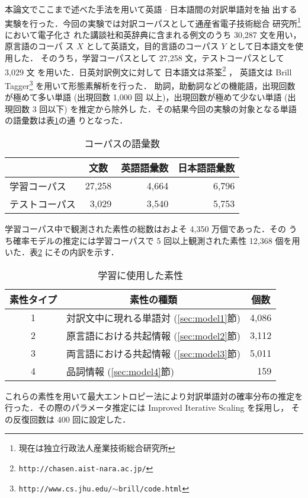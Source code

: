 本論文でここまで述べた手法を用いて英語 $\cdot$ 日本語間の対訳単語対を抽
出する実験を行った．今回の実験では対訳コーパスとして通産省電子技術総合
研究所\footnote{現在は独立行政法人産業技術総合研究所}において電子化さ
れた講談社和英辞典に含まれる例文のうち 30,287 文を用い，原言語のコーパ
ス $X$ として英語文，目的言語のコーパス $Y$ として日本語文を使用した．
そのうち，学習コーパスとして 27,258 文，テストコーパスとして 3,029 文
を用いた．日英対訳例文に対して
日本語文は茶筌\footnote{{\tt http://chasen.aist-nara.ac.jp/}}
\cite{chasen20}，
英語文は Brill
Tagger\footnote{{\tt http://www.cs.jhu.edu/$\sim$brill/code.html}}
\cite{brill_94}
を用いて形態素解析を行った．
助詞，助動詞などの機能語，出現回数が極めて多い単語 (出現回数 1,000 回
以上)，出現回数が極めて少ない単語 (出現回数 3 回以下) を推定から除外し
た．その結果今回の実験の対象となる単語の語彙数は表\ref{tab:corpus}の通
りとなった．
\begin{table}[htbp]
  \centering
  \caption{コーパスの語彙数}
  \label{tab:corpus}
  \begin{tabular}{l|r|r|r} \hline
    & \multicolumn{1}{c|}{文数} &
    \multicolumn{1}{c|}{英語語彙数} &
    \multicolumn{1}{c}{日本語語彙数} \\ \hline
    学習コーパス & 27,258 & 4,664 & 6,796 \\
    テストコーパス & 3,029 & 3,540 & 5,753 \\ \hline
  \end{tabular}
\end{table}

学習コーパス中で観測された素性の総数はおよそ 4,350 万個であった．その
うち確率モデルの推定には学習コーパスで 5 回以上観測された素性 12,368
個を用いた．表\ref{tab:feature} にその内訳を示す．
\begin{table}[htbp]
  \centering
  \caption{学習に使用した素性}
  \label{tab:feature}
  \begin{tabular}{c|l|r} \hline
    \multicolumn{1}{c|}{素性タイプ} &
    \multicolumn{1}{c|}{素性の種類} &
    \multicolumn{1}{c}{個数} \\ \hline

    1 &
    対訳文中に現れる単語対 (\ref{sec:model1}節) &
    4,086 \\

    2 &
    原言語における共起情報 (\ref{sec:model2}節) &
    3,112 \\

    3 &
    両言語における共起情報 (\ref{sec:model3}節) &
    5,011 \\

    4 &
    品詞情報 (\ref{sec:model4}節) &
    159 \\ \hline
  \end{tabular}
\end{table}
これらの素性を用いて最大エントロピー法により対訳単語対の確率分布の推定を
行った．その際のパラメータ推定には Improved Iterative Scaling を採用し，
その反復回数は 400 回に設定した．

